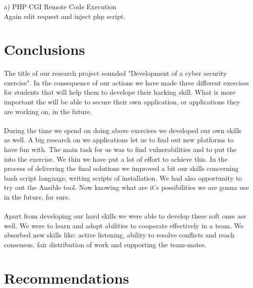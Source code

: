 \documentclass[12pt, a4paper]{article}
\begin{document}
a) PHP CGI Remote Code Execution\\
Again edit request and inject php script.\\


\newpage{}



\section{Conclusions}
\paragraph{}The title of our research project sounded "Development of a cyber security exercise". In the consequence of our actions we have made three different exercises for students that will help them to develope their hacking skill. What is more important the will be able to secure their own application, or applications they are working on, in the future.

\paragraph{}During the time we spend on doing above exercises we developed our own skills as well. A big research on we applications let us to find out new platforms to have fun with. The main task for us was to find vulnerabilities and to put the into the exercise. We thin we have put a lot of effort to achieve this. In the process of delivering the final solutions we improved a bit our skills concerning bash script language, writing scripts of installation. We had also opportunity to try out the Ansible tool. Now knowing what are it's possibilities we are gonna use in the future, for sure. 

\paragraph{}Apart from developing our hard skills we were able to develop these soft ones ass well. We were to learn and adopt abilities to cooperate effectively in a team. We absorbed new skills like: active listening, ability to resolve conflicts and reach consensus, fair distribution of work and supporting the team-mates.

\section{Recommendations}
\end{document}
